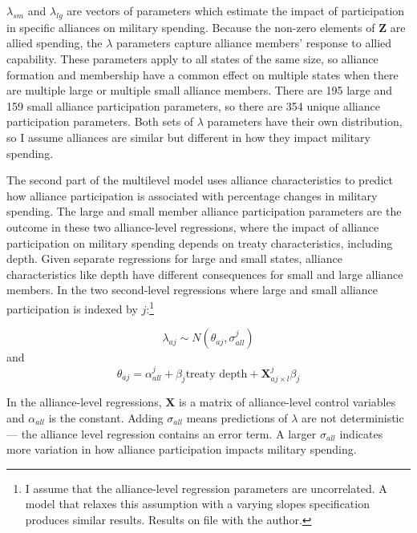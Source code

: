 \documentclass[12pt]{article}
\begin{document}
$\lambda_{sm}$ and $\lambda_{lg}$ are vectors of parameters which estimate the impact of participation in specific alliances on military spending. 
Because the non-zero elements of $\textbf{Z}$ are allied spending, the $\lambda$ parameters capture alliance members' response to allied capability. 
These parameters apply to all states of the same size, so alliance formation and membership have a common effect on multiple states when there are multiple large or multiple small alliance members.
There are 195 large and 159 small alliance participation parameters, so there are 354 unique alliance participation parameters. 
Both sets of $\lambda$ parameters have their own distribution, so I assume alliances are similar but different in how they impact military spending. 


The second part of the multilevel model uses alliance characteristics to predict how alliance participation is associated with percentage changes in military spending. 
The large and small member alliance participation parameters are the outcome in these two alliance-level regressions, where the impact of alliance participation on military spending depends on treaty characteristics, including depth. 
Given separate regressions for large and small states, alliance characteristics like depth have different consequences for small and large alliance members. 
In the two second-level regressions where large and small alliance participation is indexed by $j$:\footnote{I assume that the alliance-level regression parameters are uncorrelated. A model that relaxes this assumption with a varying slopes specification produces similar results. Results on file with the author.}


\begin{equation}
\lambda_{aj} \sim N(\theta_{aj}, \sigma^{j}_{all})
\end{equation} 
and 
\begin{equation}
\theta_{aj} = \alpha^{j}_{all} + \beta_{j} \mbox{treaty depth} + \textbf{X}^{j}_{aj \times l} \beta_{j}
\end{equation}


In the alliance-level regressions, $\textbf{X}$ is a matrix of alliance-level control variables and $\alpha_{all}$ is the constant.
Adding $\sigma_{all}$ means predictions of $\lambda$ are not deterministic--- the alliance level regression contains an error term. 
A larger $\sigma_{all}$ indicates more variation in how alliance participation impacts military spending. 
\end{document}
